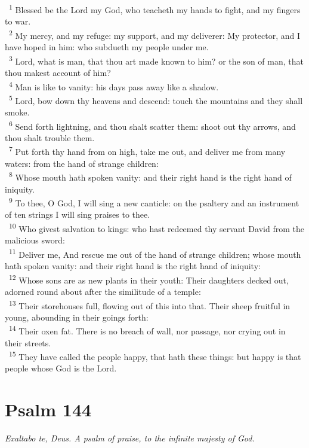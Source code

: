 \documentclass[a5paper,12pt]{article}
\begin{document}
\begin{multicols*}{2}
~\textsuperscript{1} Blessed be the Lord my God, who teacheth my hands to fight, and my fingers to war.\\
~\textsuperscript{2} My mercy, and my refuge: my support, and my deliverer: My protector, and I have hoped in him: who subdueth my people under me.\\
~\textsuperscript{3} Lord, what is man, that thou art made known to him? or the son of man, that thou makest account of him?\\
~\textsuperscript{4} Man is like to vanity: his days pass away like a shadow.\\
~\textsuperscript{5} Lord, bow down thy heavens and descend: touch the mountains and they shall smoke.\\
~\textsuperscript{6} Send forth lightning, and thou shalt scatter them: shoot out thy arrows, and thou shalt trouble them.\\
~\textsuperscript{7} Put forth thy hand from on high, take me out, and deliver me from many waters: from the hand of strange children:\\
~\textsuperscript{8} Whose mouth hath spoken vanity: and their right hand is the right hand of iniquity.\\
~\textsuperscript{9} To thee, O God, I will sing a new canticle: on the psaltery and an instrument of ten strings I will sing praises to thee.\\
~\textsuperscript{10} Who givest salvation to kings: who hast redeemed thy servant David from the malicious sword:\\
~\textsuperscript{11} Deliver me, And rescue me out of the hand of strange children; whose mouth hath spoken vanity: and their right hand is the right hand of iniquity:\\
~\textsuperscript{12} Whose sons are as new plants in their youth: Their daughters decked out, adorned round about after the similitude of a temple:\\
~\textsuperscript{13} Their storehouses full, flowing out of this into that. Their sheep fruitful in young, abounding in their goings forth:\\
~\textsuperscript{14} Their oxen fat. There is no breach of wall, nor passage, nor crying out in their streets.\\
~\textsuperscript{15} They have called the people happy, that hath these things: but happy is that people whose God is the Lord.\\

\section{Psalm 144}
\label{sec:org888141f}
\emph{Exaltabo te, Deus. A psalm of praise, to the infinite majesty of God.}\\


\end{multicols*}
\end{document}
